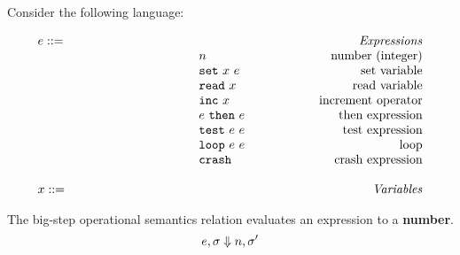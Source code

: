 \documentclass[addpoints]{exam}
\begin{document}
\begin{questions}

  \question[15]
  Consider the following language:

\newcommand{\mydefhead}[2]{\multicolumn{2}{l}{{#1}}&\mbox{\emph{#2}}\\}
\newcommand{\mydefcase}[2]{\qquad\qquad\qquad\qquad\qquad\qquad& #1 &\mbox{#2}\\}

\newcommand{\setexp}[2]{\mbox{\tt set}~#1~#2}
\newcommand{\readexp}[1]{\mbox{\tt read}~#1}
\newcommand{\loopexp}[2]{\mbox{\tt loop}~#1~#2}
\newcommand{\incexp}[1]{\mbox{\tt inc}~{#1}}
\newcommand{\testexp}[2]{\mbox{\tt test}~{#1}~{#2}}
\newcommand{\thenexp}[2]{#1~\mbox{\tt then}~{#2}}
\newcommand{\crashexp}{\mbox{\tt crash}}

\newcommand{\rel}[1]{ \mbox{\sc [#1]} }

\newcommand{\sstep}[2]{{#1} \rightarrow {#2}}
\newcommand{\sstepStore}[4]{{#1},{#2} \rightarrow {#3},{#4}}
\newcommand{\bstep}[2]{{#1} \Downarrow {#2}}
\newcommand{\bstepStore}[4]{{#1},{#2} \Downarrow {#3},{#4}}

\newcommand{\ssrule}[3]{
  \rel{#1} &
  \frac{\strut\begin{array}{@{}c@{}} #2 \end{array}}
       {\strut\begin{array}{@{}c@{}} #3 \end{array}}
   \\~\\
}

\[
  \begin{array}{ll@{\qquad\qquad\qquad}r}
  \mydefhead{e ::=}{Expressions}
    \mydefcase{n}{number (integer)}
    \mydefcase{\setexp{x}{e}}{set variable}
    \mydefcase{\readexp{x}}{read variable}
    \mydefcase{\incexp{x}}{increment operator}
    \mydefcase{\thenexp{e}{e}}{then expression}
    \mydefcase{\testexp{e}{e}}{test expression}
    \mydefcase{\loopexp{e}{e}}{loop}
    \mydefcase{\crashexp}{crash expression}
  \\
  \mydefhead{x ::=\qquad\qquad\qquad\qquad}{Variables}
\end{array}
\]

  The big-step operational semantics relation evaluates an expression to a {\bf number}.
  \[\large
    \bstepStore{e}{\sigma}{n}{\sigma'}
  \]




\newcommand{\rval}{\mbox{\tt red}}
\newcommand{\gval}{\mbox{\tt green}}
\newcommand{\bval}{\mbox{\tt blue}}
\newcommand{\rot}[1]{\mbox{\tt rotate}~{#1}}
\newcommand{\ife}[3]{\mbox{\tt if}~({#1})~{\tt then}~({#2})~{\tt else}~({#3})}


\end{questions}
\end{document}
